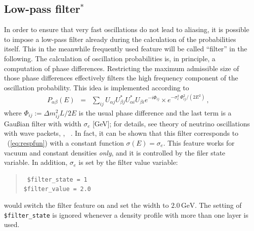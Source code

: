 \subsection{Low-pass filter$^*$}

In order to ensure that very fast oscillations do not lead to 
aliasing,
it is possible to impose a low-pass filter already during the calculation
of the probabilities itself. This in the meanwhile frequently used feature will be called ``filter'' in the following. 
The calculation of oscillation
probabilities is, in principle, a computation of phase differences. Restricting the maximum admissible size of those phase differences effectively filters
the high frequency component of the oscillation probability. This idea is
implemented according to
\begin{eqnarray}
\label{eq:filter_a}
P_{\alpha\beta}(E)&=&\sum_{ij}
U_{\alpha j} U^*_{\beta j} U^*_{\alpha i} U_{\beta i} 
e^{-i\Phi_{ij}}\times 
e^{ - \sigma_e^2 \, \Phi_{ij}^2/(2 E^2) }\,,
\end{eqnarray}
where $\Phi_{ij}:=\Delta m_{ij}^2 L/2E$ is the usual phase difference and
the last term is a Gau\ss ian filter with width $\sigma_e$ [GeV]; for details,
see  theory of neutrino oscillations with wave packets, \eg, 
\Refs~\cite{Kiers:1996zj,Giunti:2003ax}. In fact, it can be shown that this filter
corresponds to \eq~(\ref{eq:respfun}) with a constant function $\sigma(E)=\sigma_e$.
 This feature works 
for vacuum and constant densities \emph{only}, and it is controlled
by the filer state variable. In addition, $\sigma_e$ is set by the filter value variable:
\begin{quote}
{\tt
\$filter\_state = 1\\
\$filter\_value = 2.0\\
}
\end{quote}
would switch the filter feature on and set the width to $2.0\,\mathrm{GeV}$.
The setting of {\tt \$filter\_state} is ignored whenever a density profile
with more than one layer is used. 

